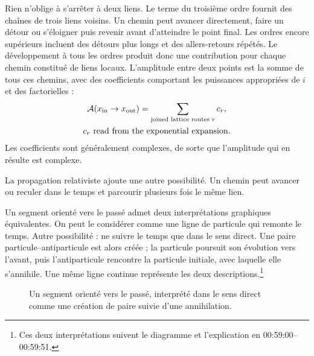 Rien n’oblige à s’arrêter à deux liens. Le terme du troisième ordre fournit des chaînes de trois liens voisins. Un chemin peut avancer directement, faire un détour ou s’éloigner puis revenir avant d’atteindre le point final. Les ordres encore supérieurs incluent des détours plus longs et des allers-retours répétés. Le développement à tous les ordres produit donc une contribution pour chaque chemin constitué de liens locaux. L’amplitude entre deux points est la somme de tous ces chemins, avec des coefficients comportant les puissances appropriées de \(i\) et des factorielles :
\begin{equation}
\begin{gathered}
\mathcal{A}(x_{\mathrm{in}}\to x_{\mathrm{out}})
=
\sum_{\text{joined lattice routes }r}c_r,
\\
c_r\ \hbox{read from the exponential expansion}.
\end{gathered}
\end{equation}
Les coefficients sont généralement complexes, de sorte que l’amplitude qui en résulte est complexe.

La propagation relativiste ajoute une autre possibilité. Un chemin peut avancer ou reculer dans le temps et parcourir plusieurs fois le même lien.

\begin{classroomqa}
\end{classroomqa}

Un segment orienté vers le passé admet deux interprétations graphiques équivalentes. On peut le considérer comme une ligne de particule qui remonte le temps. Autre possibilité : ne suivre le temps que dans le sens direct. Une paire particule--antiparticule est alors créée ; la particule poursuit son évolution vers l’avant, puis l’antiparticule rencontre la particule initiale, avec laquelle elle s’annihile. Une même ligne continue représente les deux descriptions.\footnote{Ces deux interprétations suivent le diagramme et l’explication en 00:59:00--00:59:51.}

\begin{figure}[htbp]
\centering
{}
\caption{Un segment orienté vers le passé, interprété dans le sens direct comme une création de paire suivie d’une annihilation.}
\end{figure}

